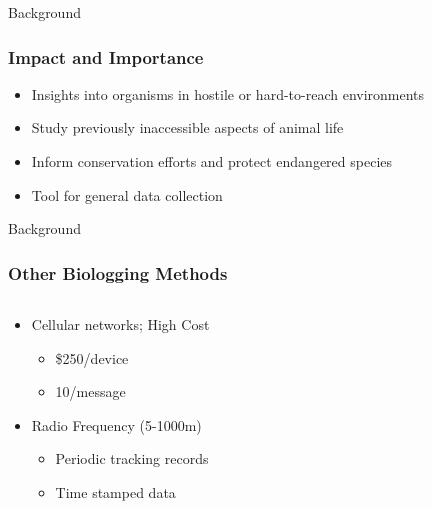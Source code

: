\documentclass{beamer}
\begin{document}
\begin{frame}{Background}
  \frametitle{Impact and Importance}
        \begin{itemize}
          \item Insights into organisms in hostile or hard-to-reach environments
          \item Study previously inaccessible aspects of animal life
          \item Inform conservation efforts and protect endangered species
          \item Tool for general data collection
        \end{itemize}
\end{frame}

\begin{frame}{Background}
  \frametitle{Other Biologging Methods}
  \begin{columns}
    \begin{column}{0.5\textwidth}
        \begin{itemize}
          \item Cellular networks; High Cost
          \begin{itemize}
            \item \$250/device
            \item 10\textcent/message
          \end{itemize}
          \item Radio Frequency (5-1000m)
          \begin{itemize}
            \item Periodic tracking records
            \item Time stamped data
          \end{itemize}
        \end{itemize}
      \end{column}
      \begin{column}{.5\textwidth}
        \begin{figure}[htbp]
          \centering

\end{figure}
\end{column}
\end{columns}
\end{frame}
\end{document}
